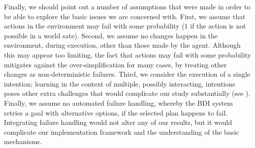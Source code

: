 Finally, we should point out a number of assumptions that were made in order to
be able to explore the basic issues we are concerned with.
First, we assume that actions in the environment may fail with some probability
($1$ if the action is not possible in a world sate).
Second, we assume no changes happen in the environment, during execution, other
than those made by the agent. Although this may appear too limiting, the fact
that actions may fail with some probability mitigates against the
over-simplification for many cases, by treating other changes as
non-deterministic failures.
Third, we consider the execution of a single intention; learning in the context
of multiple, possibly interacting, intentions poses other extra challenges that
would complicate our study substantially (see \cite{Thangarajah02}).
Finally, we assume no automated failure handling, whereby the BDI system retries
a goal with alternative options, if the selected plan happens to fail. 
Integrating failure handling would not alter any of our results, but it would
complicate our implementation framework and the understanding of the basic
mechanisms.



% 
% 
% 



